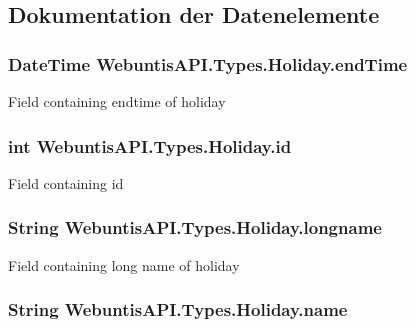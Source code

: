\subsection{Dokumentation der Datenelemente}
\hypertarget{struct_webuntis_a_p_i_1_1_types_1_1_holiday_a8554b4c5a0b600762065145df7666519}{
\subsubsection[{end\-Time}]{\setlength{\rightskip}{0pt plus 5cm}Date\-Time Webuntis\-A\-P\-I.\-Types.\-Holiday.\-end\-Time}}\label{struct_webuntis_a_p_i_1_1_types_1_1_holiday_a8554b4c5a0b600762065145df7666519}
Field containing endtime of holiday \hypertarget{struct_webuntis_a_p_i_1_1_types_1_1_holiday_af850132078feaf8f2395e20a0800d74a}{
\subsubsection[{id}]{\setlength{\rightskip}{0pt plus 5cm}int Webuntis\-A\-P\-I.\-Types.\-Holiday.\-id}}\label{struct_webuntis_a_p_i_1_1_types_1_1_holiday_af850132078feaf8f2395e20a0800d74a}
Field containing id \hypertarget{struct_webuntis_a_p_i_1_1_types_1_1_holiday_afb7e41fafeec189033e04da99946817f}{
\subsubsection[{longname}]{\setlength{\rightskip}{0pt plus 5cm}String Webuntis\-A\-P\-I.\-Types.\-Holiday.\-longname}}\label{struct_webuntis_a_p_i_1_1_types_1_1_holiday_afb7e41fafeec189033e04da99946817f}
Field containing long name of holiday \hypertarget{struct_webuntis_a_p_i_1_1_types_1_1_holiday_a092c9f61df2c8287135afb4551cbacdc}{
\subsubsection[{name}]{\setlength{\rightskip}{0pt plus 5cm}String Webuntis\-A\-P\-I.\-Types.\-Holiday.\-name}}\label{struct_webuntis_a_p_i_1_1_types_1_1_holiday_a092c9f61df2c8287135afb4551cbacdc}
